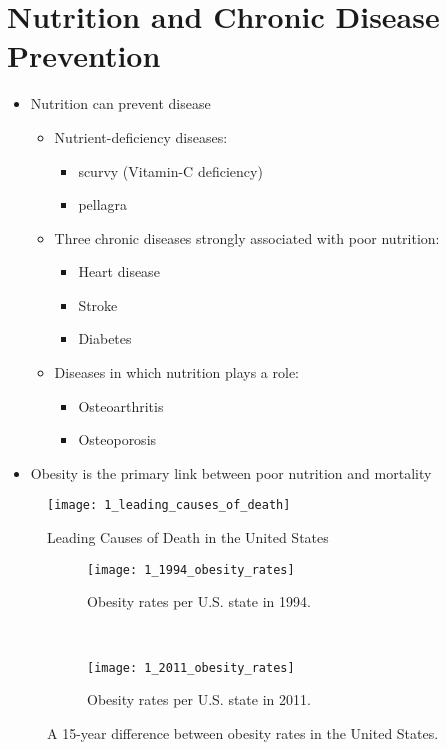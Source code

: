 \documentclass[title={Chapter 1}]{fdsn201notes}
\begin{document}
\section{Nutrition and Chronic Disease Prevention}\label{sec:nutrition-and-chronic-disease-prevention}
\begin{itemize}
	\item Nutrition can prevent disease
	\begin{itemize}
		\item Nutrient-deficiency diseases:
		\begin{itemize}
			\item scurvy (Vitamin-C deficiency)
			\item pellagra
		\end{itemize}
		\item Three chronic diseases strongly associated with poor nutrition:
		\begin{itemize}
			\item Heart disease
			\item Stroke
			\item Diabetes
		\end{itemize}
		\item Diseases in which nutrition plays a role:
		\begin{itemize}
			\item Osteoarthritis
			\item Osteoporosis
		\end{itemize}
	\end{itemize}
	\item Obesity is the primary link between poor nutrition and mortality
\end{itemize}

\begin{figure}[H]
	\centering
	\texttt{[image: 1\_leading\_causes\_of\_death]}
	\caption{Leading Causes of Death in the United States}
	\label{fig:leading_causes_of_death_in_us}
\end{figure}

\begin{figure}[H]
	\centering
	\begin{subfigure}[b]{0.475\textwidth}
		\texttt{[image: 1\_1994\_obesity\_rates]}
		\caption{Obesity rates per U.S. state in 1994.}
		\label{fig:1994_obesity_rates}
	\end{subfigure}
	~
	\begin{subfigure}[b]{0.475\textwidth}
		\texttt{[image: 1\_2011\_obesity\_rates]}
		\caption{Obesity rates per U.S. state in 2011.}
		\label{fig:2011_obesity_rates}
	\end{subfigure}
	\caption{A 15-year difference between obesity rates in the United States.}
	\label{fig:15_year_obesity_shift}
\end{figure}
\end{document}
